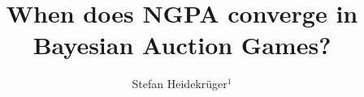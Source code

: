 \documentclass[reqno]{amsart}
\numberwithin{equation}{section}  %
\theoremstyle{plain}
\theoremstyle{definition}
\theoremstyle{remark}
\numberwithin{theorem}{section}
\numberwithin{remark}{section}
\numberwithin{example}{section}
\begin{document}


\title
[NPGA Convergence in Auctions]
{When does NGPA converge in Bayesian Auction Games?}


\author
[S.~Heidekrüger]
{Stefan Heidekrüger$^{1}$}
\address{$^{1}$
Department of Informatics, Technical University of Munich}





  



\newcommand{\acdef}[1]{\textit{\acl{#1}} \textup{(\acs{#1})}\acused{#1}}
\newcommand{\acdefp}[1]{\emph{\aclp{#1}} \textup(\acsp{#1}\textup)\acused{#1}}
\newcommand{\acli}[1]{\textit{\acl{#1}}}




\begin{abstract}

\end{abstract}
\acresetall{}
\end{document}
